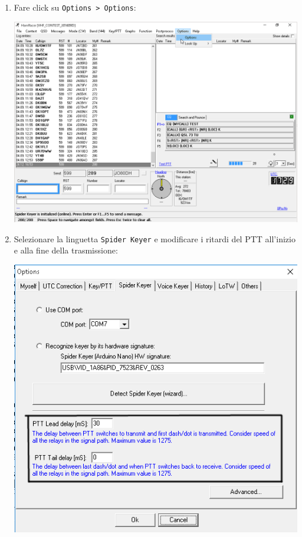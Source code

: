 \begin{enumerate}
	\item Fare click su \texttt{Options > Options}:
	\begin{center}
		\includegraphics[width=\linewidth]{./config05.png}
	\end{center}
	\pagebreak
	\item Selezionare la linguetta \texttt{Spider Keyer} e modificare i ritardi del PTT all'inizio e alla fine della trasmissione:
	\begin{center}
		\includegraphics[width=\linewidth]{./config06.png}

\end{center}
\end{enumerate}
